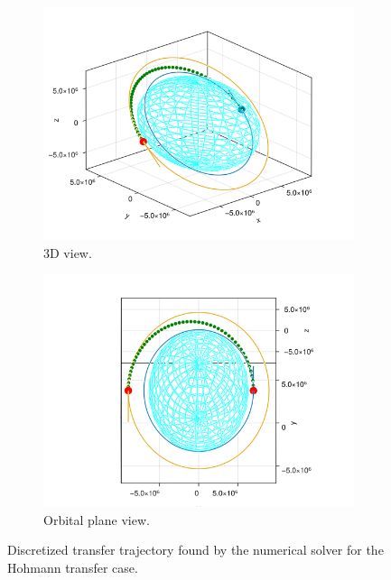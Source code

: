 \begin{figure}[htbp]
    \centering
    \begin{subfigure}{0.49\textwidth}
        \includegraphics[width=\textwidth]{img/hohmann_solved.png}
        \caption{3D view.}
    \end{subfigure}
    \begin{subfigure}{0.49\textwidth}
        \includegraphics[width=\textwidth]{img/hohmann_solved_in_plane.png}
        \caption{Orbital plane view.}
    \end{subfigure}
    \caption{Discretized transfer trajectory found by the numerical solver for the Hohmann transfer case.}
    \label{fig:hohmann_traj}
\end{figure}

